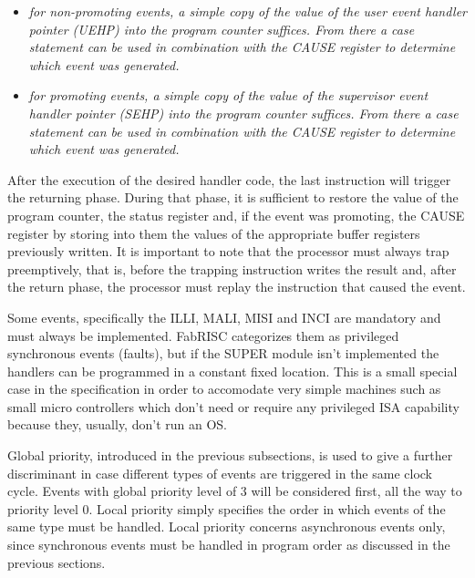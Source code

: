 \begin{enumerate}
                \begin{itemize}

                    \item \textit{for non-promoting events, a simple copy of the value of the user event handler pointer (UEHP) into the program counter suffices. From there a case statement can be used in combination with the CAUSE register to determine which event was generated.}

                    \item \textit{for promoting events, a simple copy of the value of the supervisor event handler pointer (SEHP) into the program counter suffices. From there a case statement can be used in combination with the CAUSE register to determine which event was generated.}

                \end{itemize}

        \end{enumerate}

        After the execution of the desired handler code, the last instruction will trigger the returning phase. During that phase, it is sufficient to restore the value of the program counter, the status register and, if the event was promoting, the CAUSE register by storing into them the values of the appropriate buffer registers previously written. It is important to note that the processor must always trap preemptively, that is, before the trapping instruction writes the result and, after the return phase, the processor must replay the instruction that caused the event.

        \vspace{10pt}

        Some events, specifically the ILLI, MALI, MISI and INCI are mandatory and must always be implemented. FabRISC categorizes them as privileged synchronous events (faults), but if the SUPER module isn't implemented the handlers can be programmed in a constant fixed location. This is a small special case in the specification in order to accomodate very simple machines such as small micro controllers which don't need or require any privileged ISA capability because they, usually, don't run an OS.

        \vspace{10pt} 

        Global priority, introduced in the previous subsections, is used to give a further discriminant in case different types of events are triggered in the same clock cycle. Events with global priority level of 3 will be considered first, all the way to priority level 0. Local priority simply specifies the order in which events of the same type must be handled. Local priority concerns asynchronous events only, since synchronous events must be handled in program order as discussed in the previous sections.

